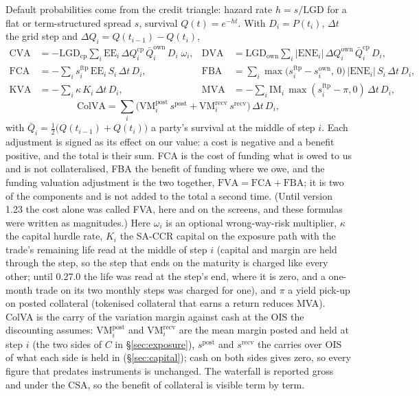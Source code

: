 \documentclass[11pt,a4paper]{article}
\begin{document}
Default probabilities come from the credit triangle: hazard rate $h = s/\mathrm{LGD}$ for a flat or term-structured spread $s$, survival $Q(t)=e^{-ht}$. With $D_i=P(t_i)$, $\Delta t$ the grid step and $\Delta Q_i = Q(t_{i-1})-Q(t_i)$,
\begin{align}
\mathrm{CVA} &= -\mathrm{LGD}_{\mathrm{cp}}\sum_i \mathrm{EE}_i\,\Delta Q^{\mathrm{cp}}_i\,\bar Q^{\mathrm{own}}_i\,D_i\;\omega_i, &
\mathrm{DVA} &= \mathrm{LGD}_{\mathrm{own}}\sum_i |\mathrm{ENE}_i|\,\Delta Q^{\mathrm{own}}_i\,\bar Q^{\mathrm{cp}}_i\,D_i,\\
\mathrm{FCA} &= -\sum_i s^{\mathrm{ftp}}_i\,\mathrm{EE}_i\,S_i\,\Delta t\,D_i, &
\mathrm{FBA} &= \sum_i \max\!\big(s^{\mathrm{ftp}}_i-s^{\mathrm{own}}_i,\,0\big)\,|\mathrm{ENE}_i|\,S_i\,\Delta t\,D_i,\\
\mathrm{KVA} &= -\sum_i \kappa\,K_i\,\Delta t\,D_i, &
\mathrm{MVA} &= -\sum_i \mathrm{IM}_i\,\max(s^{\mathrm{ftp}}_i-\pi,0)\,\Delta t\,D_i,
\end{align}
\begin{equation}
\mathrm{ColVA} = \sum_i \big(\mathrm{VM}^{\mathrm{post}}_i\,s^{\mathrm{post}} + \mathrm{VM}^{\mathrm{recv}}_i\,s^{\mathrm{recv}}\big)\,\Delta t\,D_i,
\end{equation}
with $\bar Q_i=\tfrac12\big(Q(t_{i-1})+Q(t_i)\big)$ a party's survival at the middle of step $i$. Each adjustment is signed as its effect on our value: a cost is negative and a benefit positive, and the total is their sum. FCA is the cost of funding what is owed to us and is not collateralised, FBA the benefit of funding where we owe, and the funding valuation adjustment is the two together, $\mathrm{FVA}=\mathrm{FCA}+\mathrm{FBA}$; it is two of the components and is not added to the total a second time. (Until version 1.23 the cost alone was called FVA, here and on the screens, and these formulas were written as magnitudes.) Here $\omega_i$ is an optional wrong-way-risk multiplier, $\kappa$ the capital hurdle rate, $K_i$ the SA-CCR capital on the exposure path with the trade's remaining life read at the middle of step $i$ (capital and margin are held through the step, so the step that ends on the maturity is charged like every other; until 0.27.0 the life was read at the step's end, where it is zero, and a one-month trade on its two monthly steps was charged for one), and $\pi$ a yield pick-up on posted collateral (tokenised collateral that earns a return reduces MVA). ColVA is the carry of the variation margin against cash at the OIS the discounting assumes: $\mathrm{VM}^{\mathrm{post}}_i$ and $\mathrm{VM}^{\mathrm{recv}}_i$ are the mean margin posted and held at step $i$ (the two sides of $C$ in \S\ref{sec:exposure}), $s^{\mathrm{post}}$ and $s^{\mathrm{recv}}$ the carries over OIS of what each side is held in (\S\ref{sec:capital}); cash on both sides gives zero, so every figure that predates instruments is unchanged. The waterfall is reported gross and under the CSA, so the benefit of collateral is visible term by term.
\end{document}
